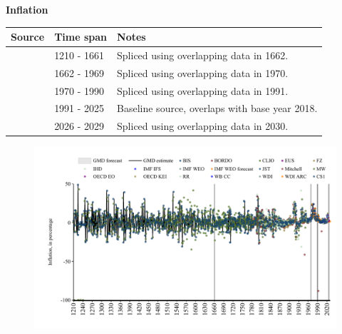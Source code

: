 \documentclass[12pt,a4paper,landscape]{article}
\begin{document}
\begin{adjustbox}{max totalsize={\paperwidth}{\paperheight},center}
\begin{minipage}[t][\textheight][t]{\textwidth}
\vspace*{0.5cm}
{}
\begin{center}
{\Large\bfseries Inflation}
\end{center}
\vspace{0.5cm}
\begin{table}[H]
\centering
\small
\begin{tabular}{|l|l|l|}
\hline
\textbf{Source} & \textbf{Time span} & \textbf{Notes} \\
\hline
\rowcolor{white}\cite{CS1_GBR}& 1210 - 1661 &Spliced using overlapping data in 1662. \\
\rowcolor{lightgray}\cite{BIS}& 1662 - 1969 &Spliced using overlapping data in 1970. \\
\rowcolor{white}\cite{WB_CC}& 1970 - 1990 &Spliced using overlapping data in 1991. \\
\rowcolor{lightgray}\cite{OECD_EO}& 1991 - 2025 &Baseline source, overlaps with base year 2018. \\
\rowcolor{white}\cite{IMF_WEO_forecast}& 2026 - 2029 &Spliced using overlapping data in 2030. \\
\hline
\end{tabular}
\end{table}
\begin{figure}[H]
\centering
\includegraphics[width=\textwidth,height=0.6\textheight,keepaspectratio]{graphs/GBR_infl.pdf}
\end{figure}
\end{minipage}
\end{adjustbox}
\end{document}
